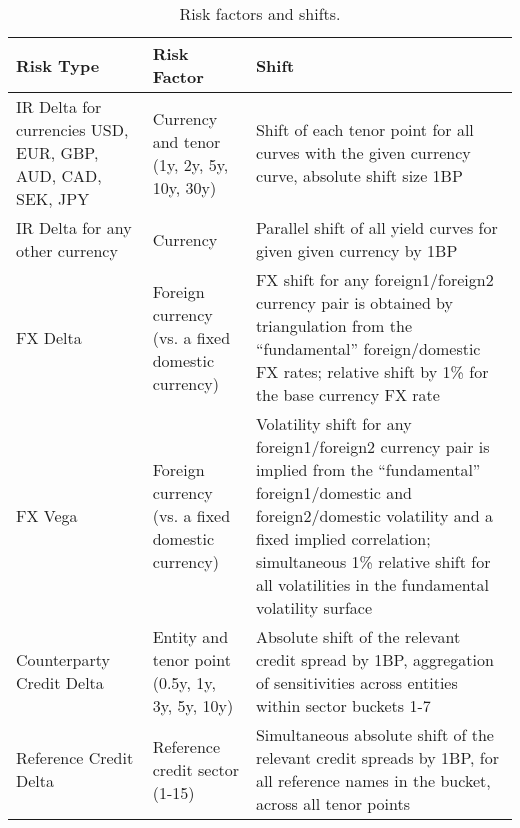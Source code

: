 \begin{center}
\begin{table}[hbt]
\begin{tabular}{|p{4cm}|p{3cm}|p{8cm}|}
\hline
Risk Type & Risk Factor & Shift \\
\hline
IR Delta for currencies USD, EUR, GBP, AUD, CAD, SEK, JPY & 
Currency and tenor (1y, 2y, 5y, 10y, 30y) & Shift of each tenor point for all curves with the given currency curve, absolute shift size 1BP \\
\hline
IR Delta for any other currency  & 
Currency & 
Parallel shift of all yield curves for given given currency by 1BP \\
\hline
FX Delta & 
Foreign currency (vs. a fixed domestic currency) & 
FX shift for any foreign1/foreign2 currency pair is obtained by triangulation from the ``fundamental'' foreign/domestic FX rates; relative shift by 1\% for the base currency FX rate \\
\hline
FX Vega & 
Foreign currency (vs. a fixed domestic currency) & 
Volatility shift for any foreign1/foreign2 currency pair is implied from the ``fundamental'' foreign1/domestic and foreign2/domestic volatility and a fixed implied correlation; simultaneous 1\% relative shift for all volatilities in the fundamental volatility surface \\
\hline
Counterparty Credit Delta & 
Entity and tenor point (0.5y, 1y, 3y, 5y, 10y)& 
Absolute shift of the relevant credit spread by 1BP, aggregation of sensitivities across entities within sector buckets 1-7 \\
\hline
Reference Credit Delta & 
Reference credit sector (1-15) & 
Simultaneous absolute shift of the relevant credit spreads by 1BP, for all reference names in the bucket, across all tenor points\\
\hline
\end{tabular}
\caption{Risk factors and shifts.}
\label{tab:cva_sensi}
\end{table}
\end{center}

